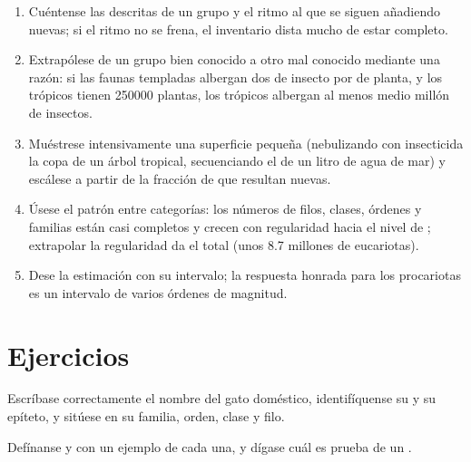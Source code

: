 \begin{method}\label{met:b1:classifying-biodiversity:estimate}
\begin{enumerate}
  \item Cuéntense las  descritas de un grupo y el ritmo al que se
        siguen añadiendo nuevas; si el ritmo no se frena, el inventario dista
        mucho de estar completo.
  \item Extrapólese de un grupo bien conocido a otro mal conocido mediante
        una razón: si las faunas templadas albergan dos  de insecto
        por  de planta, y los trópicos tienen \num{250000} plantas,
        los trópicos albergan al menos medio millón de insectos.
  \item Muéstrese intensivamente una superficie pequeña (nebulizando con
        insecticida la copa de un árbol tropical, secuenciando el  de un
        litro de agua de mar) y escálese a partir de la fracción de 
        que resultan nuevas.
  \item Úsese el patrón entre categorías: los números de filos, clases,
        órdenes y familias están casi completos y crecen con regularidad
        hacia el nivel de ; extrapolar la regularidad da el total
        (unos \num{8.7} millones de eucariotas).
  \item Dese la estimación con su intervalo; la respuesta honrada para los
        procariotas es un intervalo de varios órdenes de magnitud.
\end{enumerate}
\end{method}

\section{Ejercicios}

\begin{exercise}[$\star$]\label{exo:b1:classifying-biodiversity:1}
Escríbase correctamente el nombre del gato doméstico, identifíquense su
 y su epíteto, y sitúese en su familia, orden, clase y filo.
\end{exercise}

\begin{exercise}[$\star$]\label{exo:b1:classifying-biodiversity:2}
Defínanse  y  con un ejemplo de cada una, y dígase cuál
es prueba de un .
\end{exercise}

